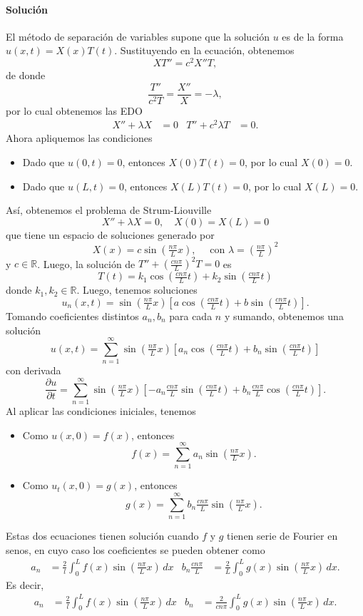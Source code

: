 \documentclass[11pt,letterpaper,draft]{report}
\theoremstyle{plain}
\theoremstyle{definition}
\theoremstyle{remark}
\newcommand\R{\mathbb R}
\newcommand\<{\langle}
\renewcommand\>{\rangle}
\begin{document}
\paragraph{Solución}
El método de separación de variables supone que la solución $u$ es de
la forma $u(x,t)=X(x)T(t)$. Sustituyendo en la ecuación, obtenemos
\[
  XT''=c^2X''T
,\]
de donde
\[
  \frac{T''}{c^2T} = \frac{X''}{X} = -\lambda
,\]
por lo cual obtenemos las EDO
\begin{align*}
  X''+\lambda X &= 0
  &
  T''+c^2\lambda T &= 0.
\end{align*}
Ahora apliquemos las condiciones
\begin{itemize}
  \item Dado que $u(0,t)=0$, entonces $X(0)T(t)=0$, por lo cual
    $X(0)=0$.
  \item Dado que $u(L,t)=0$, entonces $X(L)T(t)=0$, por lo cual
    $X(L)=0$.
\end{itemize}
Así, obtenemos el problema de Strum-Liouville
\[
  X''+\lambda X = 0, \quad X(0)=X(L)=0
\]
que tiene un espacio de soluciones generado por
\[
  X(x)=c\sin(\tfrac{n\pi}{L}x), \quad \text{ con }
  \lambda=(\tfrac{n\pi}{L})^2
\]
y $c\in\R$.
Luego, la solución de $T''+(\tfrac{cn\pi}{L})^2T=0$ es 
\[
  T(t)=k_1\cos(\tfrac{cn\pi}{L}t)+k_2\sin(\tfrac{cn\pi}{L}t)
\]
donde $k_1,k_2\in\R$.
Luego, tenemos soluciones
\[
  u_n(x,t)=\sin(\tfrac{n\pi}{L}x) \left[
    a\cos(\tfrac{cn\pi}{L}t)+b\sin(\tfrac{cn\pi}{L}t)
  \right]
.\]
Tomando coeficientes distintos $a_n,b_n$ para cada $n$ y sumando,
obtenemos una solución
\[
  u(x,t)
  =
  \sum_{n=1}^{\infty}\sin(\tfrac{n\pi}{L}x) \left[
    a_n\cos(\tfrac{cn\pi}{L}t)
    +b_n\sin(\tfrac{cn\pi}{L}t)
  \right]
\]
con derivada
\[
  \frac{\partial u}{\partial t}
  =
  \sum_{n=1}^{\infty}\sin(\tfrac{n\pi}{L}x) \left[
    -a_n \tfrac{cn\pi}{L}\sin(\tfrac{cn\pi}{L}t)
    +b_n \tfrac{cn\pi}{L}\cos(\tfrac{cn\pi}{L}t)
  \right]
.\]
Al aplicar las condiciones iniciales, tenemos
\begin{itemize}
  \item Como $u(x,0)=f(x)$, entonces
    \[
      f(x)=\sum_{n=1}^{\infty}a_n\sin(\tfrac{n\pi}{L}x)
    .\]
  \item Como $u_t(x,0)=g(x)$, entonces
    \[
      g(x) = \sum_{n=1}^{\infty}b_n
      \tfrac{cn\pi}{L}\sin(\tfrac{n\pi}{L}x)
    .\]
\end{itemize}
Estas dos ecuaciones tienen solución cuando $f$ y $g$ tienen serie de
Fourier en senos, en cuyo caso los
coeficientes se pueden obtener como
\begin{align*}
  a_n &= \frac{2}{l}\int_{0}^{L}f(x)\sin(\tfrac{n\pi}{L}x)\,dx
      &
  b_n \tfrac{cn\pi}{L} &=
  \frac{2}{L}\int_{0}^{L}g(x)\sin(\tfrac{n\pi}{L}x)\,dx.
\end{align*}
Es decir,
\begin{align*}
  a_n &= \frac{2}{l}\int_{0}^{L}f(x)\sin(\tfrac{n\pi}{L}x)\,dx
      &
  b_n &=
  \frac{2}{cn\pi}\int_{0}^{L}g(x)\sin(\tfrac{n\pi}{L}x)\,dx.
\end{align*}
\end{document}
